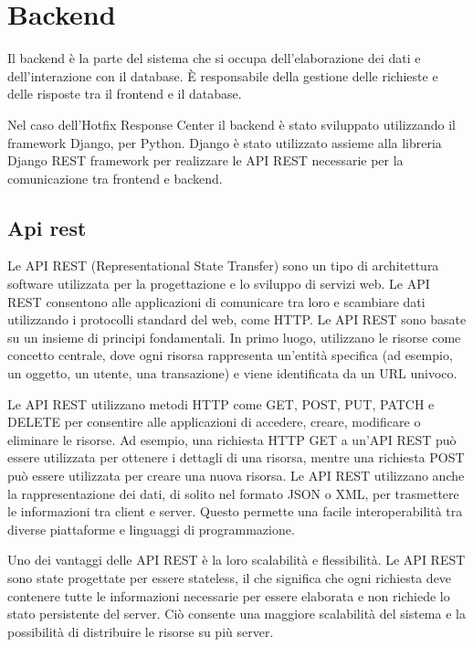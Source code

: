 \section{Backend}
Il backend è la parte del sistema che si occupa dell'elaborazione dei dati e 
dell'interazione con il database. È responsabile della gestione delle 
richieste e delle risposte tra il frontend e il database.

Nel caso dell’Hotfix Response Center il backend è stato sviluppato 
utilizzando il framework Django, per Python. Django è stato utilizzato assieme 
alla libreria Django REST framework per realizzare le API REST necessarie per 
la comunicazione tra frontend e backend.


\subsection{Api rest}
Le API REST (Representational State Transfer) sono un tipo di architettura 
software utilizzata per la progettazione e lo sviluppo di servizi web. 
Le API REST consentono alle applicazioni di comunicare tra loro e 
scambiare dati utilizzando i protocolli standard del web, come HTTP. 
Le API REST sono basate su un insieme di principi fondamentali. 
In primo luogo, utilizzano le risorse come concetto centrale, dove ogni 
risorsa rappresenta un'entità specifica (ad esempio, un oggetto, un 
utente, una transazione) e viene identificata da un URL univoco.

Le API REST utilizzano metodi HTTP come GET, POST, PUT, PATCH e DELETE 
per consentire alle applicazioni di accedere, creare, modificare o 
eliminare le risorse. Ad esempio, una richiesta HTTP GET a un'API REST 
può essere utilizzata per ottenere i dettagli di una risorsa, mentre una 
richiesta POST può essere utilizzata per creare una nuova risorsa.
Le API REST utilizzano anche la rappresentazione dei dati, di solito nel 
formato JSON o XML, per trasmettere le informazioni tra client e server. 
Questo permette una facile interoperabilità tra diverse piattaforme e 
linguaggi di programmazione.

Uno dei vantaggi delle API REST è la loro scalabilità e flessibilità. 
Le API REST sono state progettate per essere stateless, il che significa 
che ogni richiesta deve contenere tutte le informazioni necessarie per 
essere elaborata e non richiede lo stato persistente del server. Ciò 
consente una maggiore scalabilità del sistema e la possibilità di 
distribuire le risorse su più server. ~\cite{wiki:api_rest}\\


